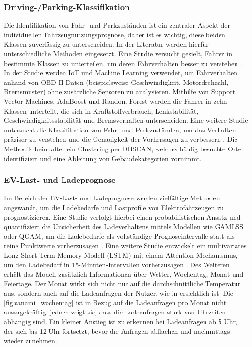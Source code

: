 \subsubsection{Driving-/Parking-Klassifikation}

Die Identifikation von Fahr- und Parkzuständen ist ein zentraler Aspekt der individuellen Fahrzeugnutzungsprognose, daher ist es wichtig, diese beiden Klassen zuverlässig zu unterscheiden. In der Literatur werden hierfür unterschiedliche Methoden eingesetzt. Eine Studie versucht gezielt, Fahrer in bestimmte Klassen zu unterteilen, um deren Fahrverhalten besser zu verstehen \parencite{kumar2023driving}. In der Studie werden IoT und Machine Learning verwendet, um Fahrverhalten anhand von OBD-II-Daten (beispielsweise Geschwindigkeit, Motordrehzahl, Bremsmuster) ohne zusätzliche Sensoren zu analysieren. Mithilfe von Support Vector Machines, AdaBoost und Random Forest werden die Fahrer in zehn Klassen unterteilt, die sich in Kraftstoffverbrauch, Lenkstabilität, Geschwindigkeitsstabilität und Bremsverhalten unterscheiden. Eine weitere Studie untersucht die Klassifikation von Fahr- und Parkzuständen, um das Verhalten präziser zu verstehen und die Genauigkeit der Vorhersagen zu verbessern \parencite{su2025parking}. Die Methodik beinhaltet ein Clustering per DBSCAN, welches häufig besuchte Orte identifiziert und eine Ableitung von Gebäudekategorien vornimmt.

\subsubsection{EV-Last- und Ladeprognose}

Im Bereich der EV-Last- und Ladeprognose werden vielfältige Methoden angewandt, um die Ladebedarfe und Lastprofile von Elektrofahrzeugen zu prognostizieren. Eine Studie verfolgt hierbei einen probabilistischen Ansatz und quantifiziert die Unsicherheit des Ladeverhaltens mittels Modellen wie GAMLSS oder QGAM, um die Ladebedarfe als vollständige Prognoseintervalle statt als reine Punktwerte vorherzusagen \parencite{amaraouali2025quantifying}. Eine weitere Studie entwickelt ein multivariates Long-Short-Term-Memory-Modell (LSTM) mit einem Attention-Mechanismus, um den Ladebedarf in 15-Minuten-Intervallen vorherzusagen \parencite{sanami2025demand}. Des Weiteren erhält das Modell zusätzlich Informationen über Wetter, Wochentag, Monat und Feiertage. Der Monat wirkt sich nicht nur auf die durchschnittliche Temperatur aus, sondern auch auf die Ladeanfragen der Nutzer, wie in  ersichtlich ist. Die \cref{fig:sanami_wochentag} ist in Bezug auf die Ladeanfragen pro Monat nicht aussagekräftig, jedoch zeigt sie, dass die Ladeanfragen stark von Uhrzeiten abhängig sind. Ein kleiner Anstieg ist zu erkennen bei Ladeanfragen ab 5 Uhr, der sich bis 12 Uhr fortsetzt, bevor die Anfragen abflachen und nachmittags wieder zunehmen.

